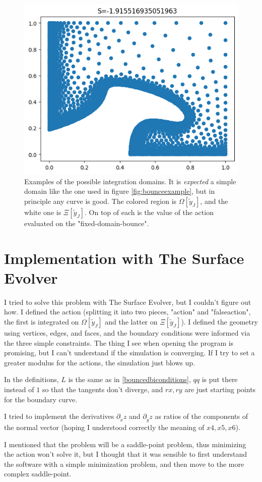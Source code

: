 \documentclass[binding=0.6cm, a4paper]{unifith/unifith}
\theoremstyle{plain}
\theoremstyle{definition}
\newcommand{\ty}{\tilde{y}}
\newcommand{\tx}{\tilde{x}}
\begin{document}
\begin{figure}[htbp]
    \qquad
    \includegraphics[width=.4\textwidth]{images/trasferimento (4).png}
\caption{Examples of the possible integration domains. It is \textit{expected} a simple domain like the one used in figure \ref{fig:bounceexample}, but in principle any curve is good. The colored region is $\Omega[\ty_J]$, and the white one is $\Xi[\ty_J]$. On top of each is the value of the action evaluated on the "fixed-domain-bounce".\label{fig:i}}
\end{figure}

\section*{Implementation with The Surface Evolver}

I tried to solve this problem with The Surface Evolver, but I couldn't figure out how. I defined the action (splitting it into two pieces, "action" and "falseaction", the first is integrated on $\Omega[\ty_J]$ and the latter on $\Xi[\ty_J]$). I defined the geometry using vertices, edges, and faces, and the boundary conditions were informed via the three simple constraints. The thing I see when opening the program is promising, but I can't understand if the simulation is converging. If I try to set a greater modulus for the actions, the simulation just blows up.

In the definitions, $L$ is the same as in \eqref{bouncedbiconditions}, $qq$ is put there instead of $1$ so that the tangents don't diverge, and $rx,ry$ are just starting points for the boundary curve.

I tried to implement the derivatives $\partial_\tx z$ and $\partial_\ty z$ as ratios of the components of the normal vector (hoping I understood correctly the meaning of $x4,x5,x6$).

I mentioned that the problem will be a saddle-point problem, thus minimizing the action won't solve it, but I thought that it was sensible to first understand the software with a simple minimization problem, and then move to the more complex saddle-point.
\end{document}
